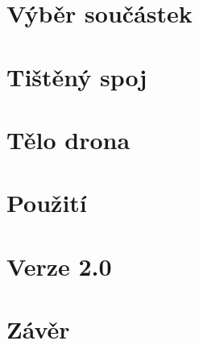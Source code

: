 \documentclass[11pt,a4paper,openright]{report}
\begin{document}


\setcounter{tocdepth}{2}
\tableofcontents

\chapter{Výběr součástek}

\pagestyle{fancy}


\chapter{Tištěný spoj}


\chapter{Tělo drona}


\chapter{Použití}


\chapter{Verze 2.0}


\chapter*{Závěr}


\nocite{einstein}\nocite{latexcompanion}\nocite{knuthwebsite}
\printbibliography[title={Seznam použité literatury},heading={bibintoc}]
\end{document}
